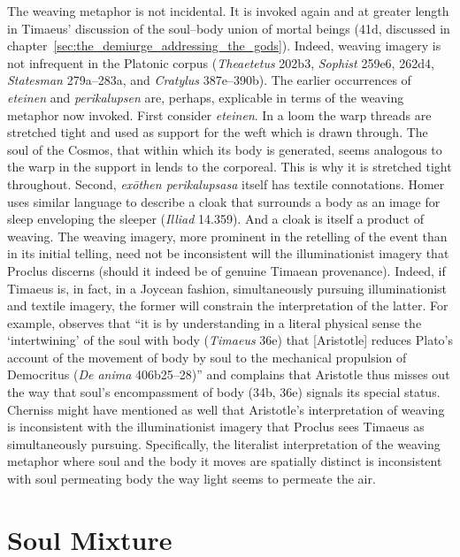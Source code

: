 The weaving metaphor is not incidental. It is invoked again and at greater length in Timaeus' discussion of the soul--body union of mortal beings (41d, discussed in chapter~\ref{sec:the_demiurge_addressing_the_gods}). Indeed, weaving imagery is not infrequent in the Platonic corpus (\emph{Theaetetus} 202b3, \emph{Sophist} 259e6, 262d4, \emph{Statesman} 279a--283a, and \emph{Cratylus} 387e--390b). The earlier occurrences of \emph{eteinen} and \emph{perikalupsen} are, perhaps, explicable in terms of the weaving metaphor now invoked. First consider \emph{eteinen}. In a loom the warp threads are stretched tight and used as support for the weft which is drawn through. The soul of the Cosmos, that within which its body is generated, seems analogous to the warp in the support in lends to the corporeal. This is why it is stretched tight throughout. Second, \emph{exōthen perikalupsasa} itself has textile connotations. Homer uses similar language to describe a cloak that surrounds a body as an image for sleep enveloping the sleeper (\emph{Illiad} 14.359). And a cloak is itself a product of weaving. The weaving imagery, more prominent in the retelling of the event than in its initial telling, need not be inconsistent will the illuminationist imagery that Proclus discerns (should it indeed be of genuine Timaean provenance). Indeed, if Timaeus is, in fact, in a Joycean fashion, simultaneously pursuing illuminationist and textile imagery, the former will constrain the interpretation of the latter. For example, \citet[406]{Cherniss:1944aa} observes that ``it is by understanding in a literal physical sense the `intertwining' of the soul with body (\emph{Timaeus} 36e) that [Aristotle] reduces Plato's account of the movement of body by soul to the mechanical propulsion of Democritus (\emph{De anima} 406b25--28)'' and complains that Aristotle thus misses out the way that soul's encompassment of body (34b, 36e) signals its special status. Cherniss might have mentioned as well that Aristotle's interpretation of weaving is inconsistent with the illuminationist imagery that Proclus sees Timaeus as simultaneously pursuing. Specifically, the literalist interpretation of the weaving metaphor where soul and the body it moves are spatially distinct is inconsistent with soul permeating body the way light seems to permeate the air.


\section{Soul Mixture} %
\label{sec:soul_mixture}

